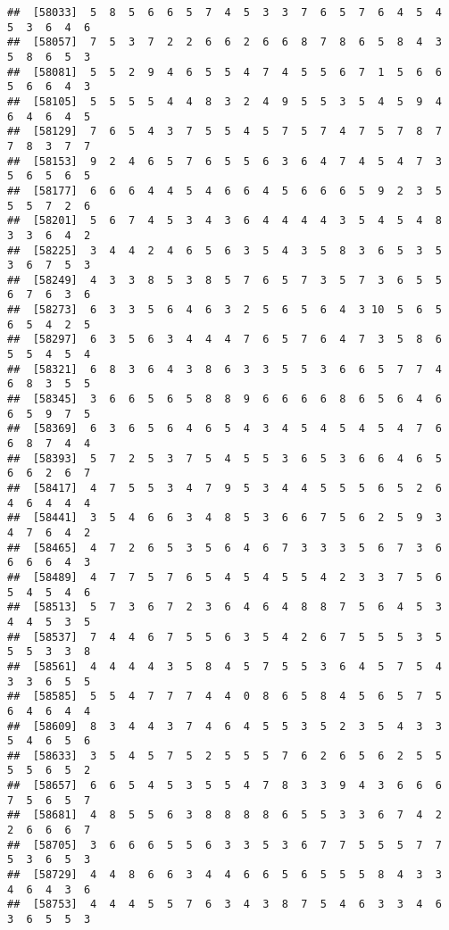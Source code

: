 \documentclass[
]{book}
\begin{document}
\begin{verbatim}
##  [58033]  5  8  5  6  6  5  7  4  5  3  3  7  6  5  7  6  4  5  4  5  3  6  4  6
##  [58057]  7  5  3  7  2  2  6  6  2  6  6  8  7  8  6  5  8  4  3  5  8  6  5  3
##  [58081]  5  5  2  9  4  6  5  5  4  7  4  5  5  6  7  1  5  6  6  5  6  6  4  3
##  [58105]  5  5  5  5  4  4  8  3  2  4  9  5  5  3  5  4  5  9  4  6  4  6  4  5
##  [58129]  7  6  5  4  3  7  5  5  4  5  7  5  7  4  7  5  7  8  7  7  8  3  7  7
##  [58153]  9  2  4  6  5  7  6  5  5  6  3  6  4  7  4  5  4  7  3  5  6  5  6  5
##  [58177]  6  6  6  4  4  5  4  6  6  4  5  6  6  6  5  9  2  3  5  5  5  7  2  6
##  [58201]  5  6  7  4  5  3  4  3  6  4  4  4  4  3  5  4  5  4  8  3  3  6  4  2
##  [58225]  3  4  4  2  4  6  5  6  3  5  4  3  5  8  3  6  5  3  5  3  6  7  5  3
##  [58249]  4  3  3  8  5  3  8  5  7  6  5  7  3  5  7  3  6  5  5  6  7  6  3  6
##  [58273]  6  3  3  5  6  4  6  3  2  5  6  5  6  4  3 10  5  6  5  6  5  4  2  5
##  [58297]  6  3  5  6  3  4  4  4  7  6  5  7  6  4  7  3  5  8  6  5  5  4  5  4
##  [58321]  6  8  3  6  4  3  8  6  3  3  5  5  3  6  6  5  7  7  4  6  8  3  5  5
##  [58345]  3  6  6  5  6  5  8  8  9  6  6  6  6  8  6  5  6  4  6  6  5  9  7  5
##  [58369]  6  3  6  5  6  4  6  5  4  3  4  5  4  5  4  5  4  7  6  6  8  7  4  4
##  [58393]  5  7  2  5  3  7  5  4  5  5  3  6  5  3  6  6  4  6  5  6  6  2  6  7
##  [58417]  4  7  5  5  3  4  7  9  5  3  4  4  5  5  5  6  5  2  6  4  6  4  4  4
##  [58441]  3  5  4  6  6  3  4  8  5  3  6  6  7  5  6  2  5  9  3  4  7  6  4  2
##  [58465]  4  7  2  6  5  3  5  6  4  6  7  3  3  3  5  6  7  3  6  6  6  6  4  3
##  [58489]  4  7  7  5  7  6  5  4  5  4  5  5  4  2  3  3  7  5  6  5  4  5  4  6
##  [58513]  5  7  3  6  7  2  3  6  4  6  4  8  8  7  5  6  4  5  3  4  4  5  3  5
##  [58537]  7  4  4  6  7  5  5  6  3  5  4  2  6  7  5  5  5  3  5  5  5  3  3  8
##  [58561]  4  4  4  4  3  5  8  4  5  7  5  5  3  6  4  5  7  5  4  3  3  6  5  5
##  [58585]  5  5  4  7  7  7  4  4  0  8  6  5  8  4  5  6  5  7  5  6  4  6  4  4
##  [58609]  8  3  4  4  3  7  4  6  4  5  5  3  5  2  3  5  4  3  3  5  4  6  5  6
##  [58633]  3  5  4  5  7  5  2  5  5  5  7  6  2  6  5  6  2  5  5  5  5  6  5  2
##  [58657]  6  6  5  4  5  3  5  5  4  7  8  3  3  9  4  3  6  6  6  7  5  6  5  7
##  [58681]  4  8  5  5  6  3  8  8  8  8  6  5  5  3  3  6  7  4  2  2  6  6  6  7
##  [58705]  3  6  6  6  5  5  6  3  3  5  3  6  7  7  5  5  5  7  7  5  3  6  5  3
##  [58729]  4  4  8  6  6  3  4  4  6  6  5  6  5  5  5  8  4  3  3  4  6  4  3  6
##  [58753]  4  4  4  5  5  7  6  3  4  3  8  7  5  4  6  3  3  4  6  3  6  5  5  3

\end{verbatim}
\end{document}
